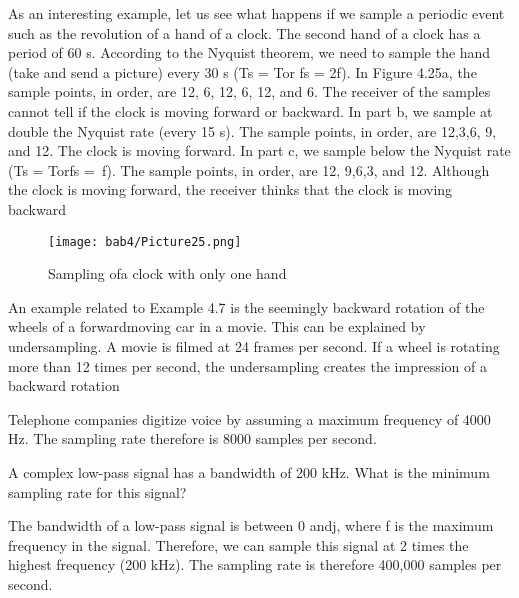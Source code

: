 \begin{example}
  As an interesting example, let us see what happens if we sample a periodic event such as the revolution of a hand of a clock. The second hand of a clock has a period of 60 s. According to the Nyquist theorem, we need to sample the hand (take and send a picture) every 30 s (Ts = Tor fs = 2f). In Figure 4.25a, the sample points, in order, are 12, 6, 12, 6, 12, and 6. The receiver of the samples cannot tell if the clock is moving forward or backward. In part b, we sample at double the Nyquist rate (every 15 s). The sample points, in order, are 12,3,6, 9, and 12. The clock is moving forward. In part c, we sample below the Nyquist rate (Ts = Torfs =~f). The sample points, in order, are 12, 9,6,3, and 12. Although the clock is moving forward, the receiver thinks that the clock is moving backward
\end{example}

\begin{figure}[htbp]
  \centering
  \texttt{[image: bab4/Picture25.png]}
  \caption{Sampling ofa clock with only one hand}
  \label{fig4:25}
\end{figure}

\vspace{12pt}

\begin{example}
  An example related to Example 4.7 is the seemingly backward rotation of the wheels of a forwardmoving car in a movie. This can be explained by undersampling. A movie is filmed at 24 frames per second. If a wheel is rotating more than 12 times per second, the undersampling creates the impression of a backward rotation
\end{example}

\vspace{12pt}

\begin{example}
  Telephone companies digitize voice by assuming a maximum frequency of 4000 Hz. The sampling rate therefore is 8000 samples per second.
\end{example}

\vspace{12pt}

\begin{example}
  A complex low-pass signal has a bandwidth of 200 kHz. What is the minimum sampling rate for this signal?
\end{example}

\begin{solution}
  The bandwidth of a low-pass signal is between 0 andj, where f is the maximum frequency in the signal. Therefore, we can sample this signal at 2 times the highest frequency (200 kHz). The sampling rate is therefore 400,000 samples per second.
\end{solution}

